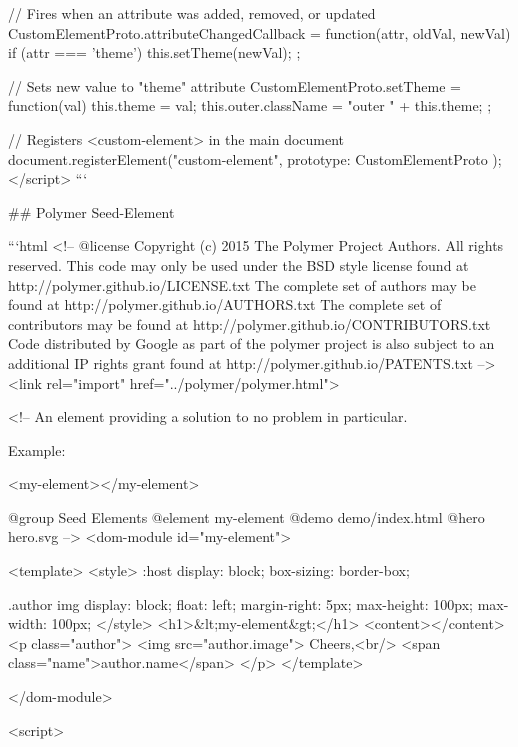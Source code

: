   // Fires when an attribute was added, removed, or updated
  CustomElementProto.attributeChangedCallback = function(attr, oldVal, newVal) {
    if (attr === 'theme') {
      this.setTheme(newVal);
    }
  };

  // Sets new value to "theme" attribute
  CustomElementProto.setTheme = function(val) {
    this.theme = val;
    this.outer.className = "outer " + this.theme;
  };

  // Registers <custom-element> in the main document
  document.registerElement("custom-element", {
    prototype: CustomElementProto
  });
</script>
```


## Polymer Seed-Element

```html
<!--
@license
Copyright (c) 2015 The Polymer Project Authors. All rights reserved.
This code may only be used under the BSD style license found at http://polymer.github.io/LICENSE.txt
The complete set of authors may be found at http://polymer.github.io/AUTHORS.txt
The complete set of contributors may be found at http://polymer.github.io/CONTRIBUTORS.txt
Code distributed by Google as part of the polymer project is also
subject to an additional IP rights grant found at http://polymer.github.io/PATENTS.txt
-->
<link rel="import" href="../polymer/polymer.html">

<!--
An element providing a solution to no problem in particular.

Example:

    <my-element></my-element>

@group Seed Elements
@element my-element
@demo demo/index.html
@hero hero.svg
-->
<dom-module id="my-element">

  <template>
    <style>
      :host {
        display: block;
        box-sizing: border-box;
      }

      .author img {
        display: block;
        float: left;
        margin-right: 5px;
        max-height: 100px;
        max-width: 100px;
      }
    </style>
    <h1>&lt;my-element&gt;</h1>
    <content></content>
    <p class="author">
      <img src="{{author.image}}">
      Cheers,<br/>
      <span class="name">{{author.name}}</span>
    </p>
  </template>

</dom-module>

<script>


